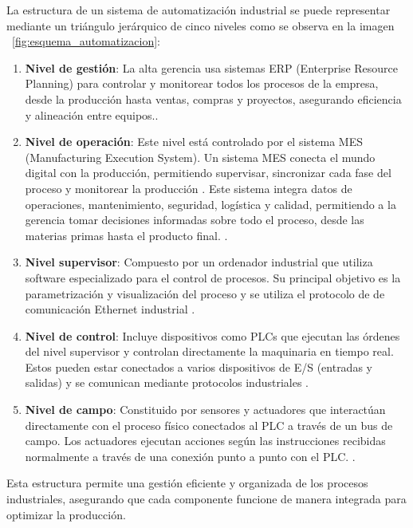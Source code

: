 La estructura de un sistema de automatización industrial se puede representar mediante un triángulo jerárquico de cinco niveles como se observa en la imagen ~\ref{fig:esquema_automatizacion}:

\begin{enumerate}
    \item \textbf{Nivel de gestión}: La alta gerencia usa sistemas ERP (Enterprise Resource Planning) para controlar y monitorear todos los procesos de la empresa, desde la producción hasta ventas, compras y proyectos, asegurando eficiencia y alineación entre equipos.\cite{niveles_automatizacion_2}.
    \item \textbf{Nivel de operación}: Este nivel está controlado por el sistema MES (Manufacturing Execution System). Un sistema MES conecta el mundo digital con la producción, permitiendo supervisar, sincronizar cada fase del proceso y monitorear la producción \cite{sistema_MES}. Este sistema integra datos de operaciones, mantenimiento, seguridad, logística y calidad, permitiendo a la gerencia tomar decisiones informadas sobre todo el proceso, desde las materias primas hasta el producto final. \cite{niveles_automatizacion_2}.
    \item \textbf{Nivel supervisor}: Compuesto por un ordenador industrial que utiliza software especializado para el control de procesos. Su principal objetivo es la parametrización y visualización del proceso y se utiliza el protocolo de de comunicación Ethernet industrial \cite{niveles_automatizacion_1}.
    \item \textbf{Nivel de control}: Incluye dispositivos como PLCs que ejecutan las órdenes del nivel supervisor y controlan directamente la maquinaria en tiempo real. Estos pueden estar conectados a varios dispositivos de E/S (entradas y salidas) y se comunican mediante protocolos industriales \cite{niveles_automatizacion_1}.
    \item \textbf{Nivel de campo}: Constituido por sensores y actuadores que interactúan directamente con el proceso físico conectados al PLC a través de un bus de campo. Los actuadores ejecutan acciones según las instrucciones recibidas normalmente a través de una conexión punto a punto con el PLC. \cite{niveles_automatizacion_1}. 
\end{enumerate}

Esta estructura permite una gestión eficiente y organizada de los procesos industriales, asegurando que cada componente funcione de manera integrada para optimizar la producción. 

